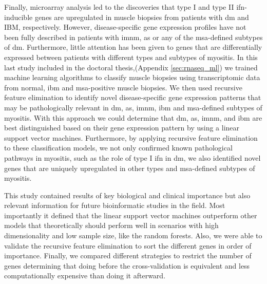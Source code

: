 Finally, microarray analysis led to the discoveries that type I and type II \gls{ifn}-inducible genes are upregulated in muscle biopsies from patients with \gls{dm}\cite{Greenberg2005} and IBM,\cite{Ivanidze2011,Allenbach2014} respectively. However, disease-specific gene expression profiles have not been fully described in patients with \gls{imnm}, \gls{as} or any of the \gls{msa}-defined subtypes of \gls{dm}. Furthermore, little attention has been given to genes that are differentially expressed between patients with different types and subtypes of myositis.\cite{Greenberg2005,Greenberg2002,Hamann2017,Raju2005} In this last study included in the doctoral thesis,(Appendix \autoref{sec:rnaseq_ml}) we trained machine learning algorithms to classify muscle biopsies using transcriptomic data from normal, \gls{ibm} and \gls{msa}-positive muscle biopsies. We then used recursive feature elimination to identify novel disease-specific gene expression patterns that may be pathologically relevant in \gls{dm},  \gls{as}, \gls{imnm}, \gls{ibm} and \gls{msa}-defined subtypes of myositis. With this approach we could determine that \gls{dm},  \gls{as}, \gls{imnm}, and \gls{ibm} are best distinguished based on their gene expression pattern by using a linear support vector machines. Furthermore, by applying recursive feature elimination to these classification models, we not only confirmed known pathological pathways in myositis, such as the role of type I \gls{ifn} in \gls{dm}, we also identified novel genes that are uniquely upregulated in other types and \gls{msa}-defined subtypes of myositis.

This study contained results of key biological and clinical importance but also relevant information for future bioinformatic studies in the field. Most importantly it defined that the linear support vector machines outperform other models that theoretically should perform well in scenarios with high dimensionality and low sample size, like the random forests. Also, we were able to validate the recursive feature elimination to sort the different genes in order of importance. Finally, we compared different strategies to restrict the number of genes determining that doing before the cross-validation is equivalent and less computationally expensive than doing it afterward.